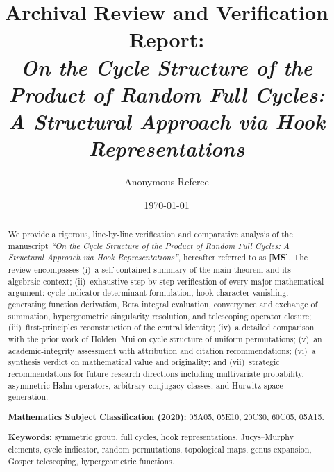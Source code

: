 \documentclass[12pt, a4paper]{amsart}
\theoremstyle{plain}
\theoremstyle{definition}
\theoremstyle{remark}
\begin{document}

\title[Archival Review: Cycle Structure of Full Cycle Products]
{Archival Review and Verification Report:\\
\textit{On the Cycle Structure of the Product of Random Full Cycles:\\
A Structural Approach via Hook Representations}}

\author{Anonymous Referee}
\address{Submitted for archival record and MathOverflow expert forum}
\date{\today}

\begin{abstract}
We provide a rigorous, line-by-line verification and comparative analysis of the
manuscript \emph{``On the Cycle Structure of the Product of Random Full Cycles:
A Structural Approach via Hook Representations''}, hereafter referred to as
\textbf{[MS]}.  The review encompasses (i)~a self-contained summary of the
main theorem and its algebraic context; (ii)~exhaustive step-by-step verification
of every major mathematical argument: cycle-indicator determinant formulation,
hook character vanishing, generating function derivation, Beta integral evaluation,
convergence and exchange of summation, hypergeometric singularity resolution, and
telescoping operator closure; (iii)~first-principles reconstruction of the central
identity; (iv)~a detailed comparison with the prior work of Holden~Mui on cycle
structure of uniform permutations; (v)~an academic-integrity assessment with
attribution and citation recommendations; (vi)~a synthesis verdict on mathematical
value and originality; and (vii)~strategic recommendations for future research
directions including multivariate probability, asymmetric Hahn operators, arbitrary
conjugacy classes, and Hurwitz space generation.

\medskip\noindent
\textbf{Mathematics Subject Classification (2020):}
05A05, 05E10, 20C30, 60C05, 05A15.

\medskip\noindent
\textbf{Keywords:}
symmetric group, full cycles, hook representations, Jucys--Murphy elements,
cycle indicator, random permutations, topological maps, genus expansion,
Gosper telescoping, hypergeometric functions.
\end{abstract}

\maketitle
\tableofcontents
\end{document}

